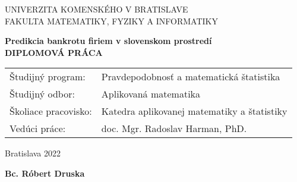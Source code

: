 \newpage
\thispagestyle{empty}
\begin{center}
{\large UNIVERZITA KOMENSKÉHO V BRATISLAVE \\
FAKULTA MATEMATIKY, FYZIKY A INFORMATIKY}
\end{center}


\vspace{5cm}
\begin{center}
{\large \bf Predikcia bankrotu firiem v slovenskom prostredí\\
\vspace{3cm}
DIPLOMOVÁ PRÁCA}
\end{center}

\vfill
\begin{flushleft}
\begin{tabular}{ll}
Študijný program: & Pravdepodobnosť a matematická štatistika \\
Študijný odbor: & Aplikovaná matematika \\
Školiace pracovisko: & Katedra aplikovanej matematiky a štatistiky \\
Vedúci práce: & doc. Mgr. Radoslav Harman, PhD. \\
\end{tabular}
\end{flushleft}

\vfill
%
\begin{multicols}{2}
\begin{flushleft} Bratislava 2022 \end{flushleft}
\begin{flushright} {\bf Bc. Róbert Druska} \end{flushright}
\end{multicols}

